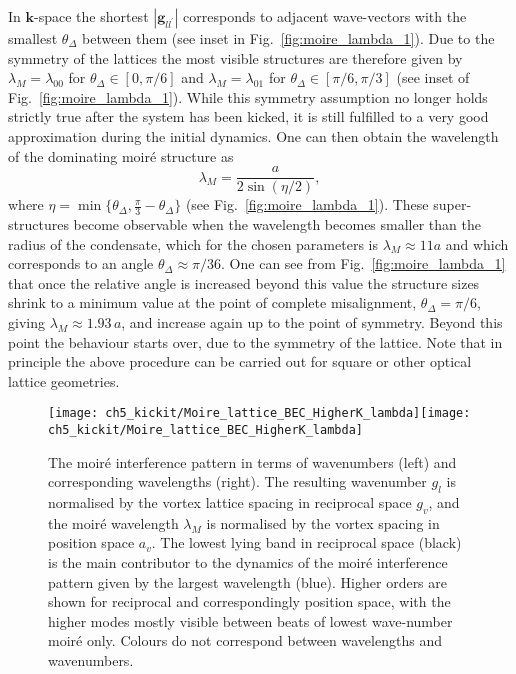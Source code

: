 In $\mathbf{k}$-space the shortest $|\mathbf{g}_{ll^\prime}|$ corresponds to adjacent wave-vectors with the smallest $\theta_\Delta$ between them (see inset in Fig.~\ref{fig:moire_lambda_1}). Due to the symmetry of the lattices the most visible structures are therefore given by $\lambda_M=\lambda_{00}$ for $\theta_\Delta\in[0,\pi/6]$ and $\lambda_M=\lambda_{01}$ for $\theta_\Delta\in[\pi/6,\pi/3]$ (see inset of Fig.~\ref{fig:moire_lambda_1}).
While this symmetry assumption no longer holds strictly true after the system has been kicked, it is still fulfilled to a very good approximation during the initial dynamics. One can then obtain the wavelength of the dominating moir\'e structure as~\cite{BIO:Blair_jneur_2007,SS:Yankowitz_natphys_2012}
    	\begin{equation}
    		\lambda_M = \frac{a}{2\sin(\eta/2)},
    		\label{eqn:moire_size}
    	\end{equation}
    where $\eta=\min\{\theta_\Delta,\frac{\pi}{3} - \theta_\Delta \} $  (see Fig.~\ref{fig:moire_lambda_1}).
These super-structures become observable when the wavelength becomes smaller than the radius of the condensate, which for the chosen parameters is $\lambda_M \approx 11a$ and which corresponds to an angle $\theta_\Delta \approx \pi/36$.
One can see from Fig.~\ref{fig:moire_lambda_1} that once the relative angle is increased beyond this value the structure sizes shrink to a minimum value at the point of complete misalignment, $\theta_\Delta=\pi/6$, giving $\lambda_M\approx 1.93\,a$, and increase again up to the point of symmetry. Beyond this point the behaviour starts over, due to the symmetry of the lattice. Note that in principle the above procedure can be carried out for square or other optical lattice geometries.

\begin{figure}
    \centering
	\texttt{[image: ch5\_kickit/Moire\_lattice\_BEC\_HigherK\_lambda]}\texttt{[image: ch5\_kickit/Moire\_lattice\_BEC\_HigherK\_lambda]}
    \caption[The moir\'e interference pattern in terms of wavenumbers.]{The moir\'e interference pattern in terms of wavenumbers (left) and corresponding wavelengths (right). The resulting wavenumber $g_l$ is normalised by the vortex lattice spacing in reciprocal space $g_v$, and the moir\'e wavelength $\lambda_M$ is normalised by the vortex spacing in position space $a_v$. The lowest lying band in reciprocal space (black) is the main contributor to the dynamics of the moir\'e interference pattern given by the largest wavelength (blue). Higher orders are shown for reciprocal and correspondingly position space, with the higher modes mostly visible between beats of lowest wave-number moir\'e only. Colours do not correspond between wavelengths and wavenumbers.}\label{fig:moire_higher}
\end{figure}


